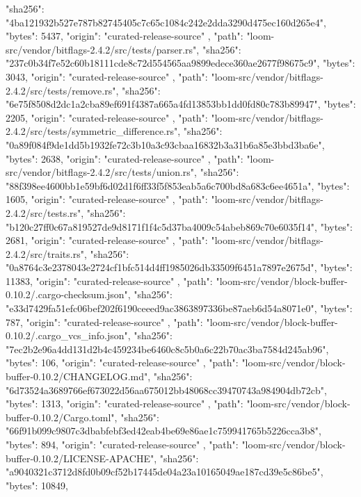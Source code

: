 {{      "sha256": "4ba121932b527e787b82745405c7c65c1084c242e2dda3290d475ec160d265e4",
      "bytes": 5437,
      "origin": "curated-release-source"
    },
    {
      "path": "loom-src/vendor/bitflags-2.4.2/src/tests/parser.rs",
      "sha256": "237c0b34f7e52c60b18111cde8c72d554565aa9899edece360ae2677f98675c9",
      "bytes": 3043,
      "origin": "curated-release-source"
    },
    {
      "path": "loom-src/vendor/bitflags-2.4.2/src/tests/remove.rs",
      "sha256": "6e75f8508d2dc1a2cba89ef691f4387a665a4fd13853bb1dd0fd80c783b89947",
      "bytes": 2205,
      "origin": "curated-release-source"
    },
    {
      "path": "loom-src/vendor/bitflags-2.4.2/src/tests/symmetric_difference.rs",
      "sha256": "0a89f084f9de1dd5b1932fe72c3b10a3c93cbaa16832b3a31b6a85e3bbd3ba6e",
      "bytes": 2638,
      "origin": "curated-release-source"
    },
    {
      "path": "loom-src/vendor/bitflags-2.4.2/src/tests/union.rs",
      "sha256": "88f398ee4600bb1e59bf6d02d1f6ff33f5f853eab5a6c700bd8a683c6ee4651a",
      "bytes": 1605,
      "origin": "curated-release-source"
    },
    {
      "path": "loom-src/vendor/bitflags-2.4.2/src/tests.rs",
      "sha256": "b120c27ff0c67a819527de9d8171f1f4c5d37ba4009c54abeb869c70e6035f14",
      "bytes": 2681,
      "origin": "curated-release-source"
    },
    {
      "path": "loom-src/vendor/bitflags-2.4.2/src/traits.rs",
      "sha256": "0a8764c3e2378043e2724cf1bfc514d4ff1985026db33509f6451a7897e2675d",
      "bytes": 11383,
      "origin": "curated-release-source"
    },
    {
      "path": "loom-src/vendor/block-buffer-0.10.2/.cargo-checksum.json",
      "sha256": "e33d7429fa51efc06bef202f6190ceeed9ac3863897336be87aeb6d54a8071e0",
      "bytes": 787,
      "origin": "curated-release-source"
    },
    {
      "path": "loom-src/vendor/block-buffer-0.10.2/.cargo_vcs_info.json",
      "sha256": "7ec2b2e96a4dd131d2b4c459234be6460c8c5b0a6c22b70ac3ba7584d245ab96",
      "bytes": 106,
      "origin": "curated-release-source"
    },
    {
      "path": "loom-src/vendor/block-buffer-0.10.2/CHANGELOG.md",
      "sha256": "6d73524a3689766ef673022d56aa675012bb48068cc39470743a984904db72cb",
      "bytes": 1313,
      "origin": "curated-release-source"
    },
    {
      "path": "loom-src/vendor/block-buffer-0.10.2/Cargo.toml",
      "sha256": "66f91b099c9807c3dbabfebf3ed42eab4be69e86ae1c759941765b5226cca3b8",
      "bytes": 894,
      "origin": "curated-release-source"
    },
    {
      "path": "loom-src/vendor/block-buffer-0.10.2/LICENSE-APACHE",
      "sha256": "a9040321c3712d8fd0b09cf52b17445de04a23a10165049ae187cd39e5c86be5",
      "bytes": 10849,
}}

